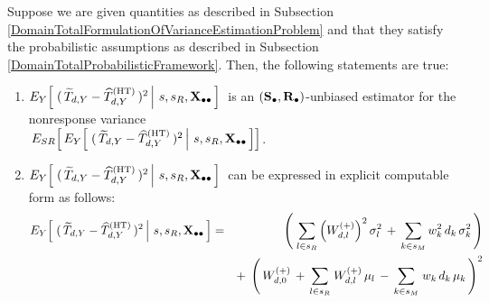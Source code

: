 \vskip 0.1cm
\begin{lemma}
\label{DomainTotalNonresponseVariance}
\mbox{}
\vskip 0.1cm
\noindent
Suppose we are given quantities as described in Subsection
\ref{DomainTotalFormulationOfVarianceEstimationProblem}
and
that they satisfy the probabilistic assumptions as described in Subsection
\ref{DomainTotalProbabilisticFramework}.
\vskip 0.1cm
\noindent
Then, the following statements are true:
\renewcommand{\theenumi}{\roman{enumi}}
\renewcommand{\labelenumi}{\mbox{}\;\;\,(\theenumi)$\quad$}
\begin{enumerate}
\item
    $
    E_{Y}\!\left[\,
        \left.
        (\,\widetilde{T}_{d,Y} - \widehat{T}^{\textnormal{(HT)}}_{d,Y}\,)^{2}
        \,\right\vert\,
        s,s_{R},\mathbf{X}_{\bullet\bullet}
        \,\right]
    $\,
    is an $(\mathbf{S}_{\bullet},\mathbf{R}_{\bullet})$-unbiased estimator for the nonresponse variance\\
    \,$
    E_{SR}\!\left[\,
    E_{Y}\!\left[\,
        \left.
        (\,\widetilde{T}_{d,Y} - \widehat{T}^{\textnormal{(HT)}}_{d,Y}\,)^{2}
        \,\right\vert\,
        s,s_{R},\mathbf{X}_{\bullet\bullet}
        \,\right]
        \right]
    $.
\item
    $
    E_{Y}\!\left[\,
        \left.
        (\,\widetilde{T}_{d,Y} - \widehat{T}^{\textnormal{(HT)}}_{d,Y}\,)^{2}
        \,\right\vert\,
        s,s_{R},\mathbf{X}_{\bullet\bullet}
        \,\right]
    $\,
    can be expressed in explicit computable form as follows:
    \begin{eqnarray*}
    E_{Y}\!\left[\,
        \left.
        (\,\widetilde{T}_{d,Y} - \widehat{T}^{\textnormal{(HT)}}_{d,Y}\,)^{2}
        \,\right\vert\,
        s,s_{R},\mathbf{X}_{\bullet\bullet}
        \,\right]
    & = &
        \left(\;
            \underset{l \in s_{R}}{\sum}
                \left(W^{(+)}_{d,l}\right)^{2}\sigma_{l}^{2}
            \,+\,
            \underset{k \in s_{M}}{\sum}\,
                w_{k}^{2}\,d_{k}\,\sigma_{k}^{2}
            \,\right)
    \\
    &&
        +\;
        \left(\,
            W^{(+)}_{d,0}
            \,+\,
            \underset{l \in s_{R}}{\sum}\;W^{(+)}_{d,l}\,\mu_{l}
            \,-\,
            \underset{k \in s_{M}}{\sum}\;w_{k}\,d_{k}\,\mu_{k}
            \,\right)^{2}
    \end{eqnarray*}
\end{enumerate}
\end{lemma}
\proof
